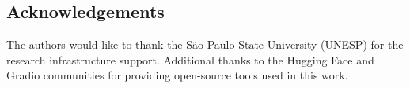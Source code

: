 \documentclass[pdflatex,sn-mathphys-num]{sn-jnl}%
\theoremstyle{thmstyleone}%
\theoremstyle{thmstyletwo}%
\theoremstyle{thmstylethree}%
\begin{document}
\subsection*{Acknowledgements}
The authors would like to thank the São Paulo State University (UNESP) for the research infrastructure support. Additional thanks to the Hugging Face and Gradio communities for providing open-source tools used in this work.



\end{document}
